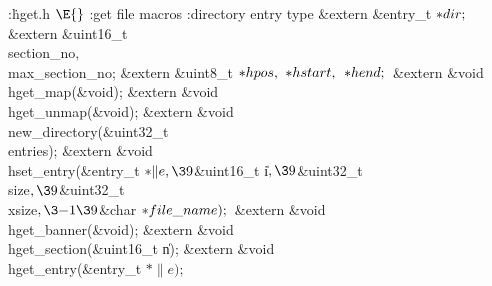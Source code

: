 \Y\B\4:\.{hget.h }\X${}\E{}$\6
:get file macros\X\6
:directory entry type\X\7
\&{extern} \&{entry\_t} ${}{*}\index{dir+\\{dir}}\\{dir};{}$\6
\&{extern} \&{uint16\_t} \\{section\_no}${},{}$ \\{max\_section\_no};\6
\&{extern} \&{uint8\_t} ${}{*}\index{hpos+\\{hpos}}\\{hpos},{}$ ${}{*}\index{hstart+\\{hstart}}\\{hstart},{}$ ${}{*}\index{hend+\\{hend}}\\{hend};{}$\6
\&{extern} \&{void} \\{hget\_map}(\&{void});\6
\&{extern} \&{void} \\{hget\_unmap}(\&{void});\6
\&{extern} \&{void} \\{new\_directory}(\&{uint32\_t} \\{entries});\6
\&{extern} \&{void} \\{hset\_entry}(\&{entry\_t} ${}{*}\|e,\39{}$\&{uint16\_t} \|i${},\39{}$\&{uint32\_t} \\{size}${},\39{}$\&{uint32\_t} \\{xsize}${},\3{-1}\39{}$\&{char} ${}{*}\index{file name+\\{file\_name}}\\{file\_name});{}$\6
\&{extern} \&{void} \\{hget\_banner}(\&{void});\6
\&{extern} \&{void} \\{hget\_section}(\&{uint16\_t} \|n);\6
\&{extern} \&{void} \\{hget\_entry}(\&{entry\_t} ${}{*}\|e);{}$\6
